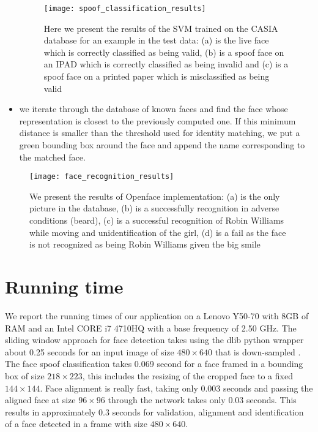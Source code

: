\begin{itemize}
	\begin{figure}[H]
		\captionsetup{width=15cm,font=small}
		\begin{center}
			\texttt{[image: spoof\_classification\_results]}
			\caption[Examples on spoof classification]{Here we present the results of the SVM trained on the CASIA database for an example in the test data: (a) is the live face which is correctly classified as being valid, (b) is a spoof face on an IPAD which is correctly classified as being invalid and (c) is a spoof face on a printed paper which is misclassified as being valid}
		\end{center}
		\label{fig:spoof_classification_results}
	\end{figure}
	\item we iterate through the database of known faces and find the face whose representation is closest to the previously computed one. If this minimum distance is smaller than the threshold used for identity matching, we put a green bounding box around the face and append the name corresponding to the matched face. 
\end{itemize} 
\begin{figure}[H]
	\captionsetup{width=15cm,font=small}
	\begin{center}
		\texttt{[image: face\_recognition\_results]}
		\caption[Examples of face recognition]{We present the results of Openface implementation: (a) is the only picture in the database, (b) is a successfully recognition in adverse conditions (beard), (c) is a successful recognition of Robin Williams while moving and unidentification of the girl, (d) is a fail as the face is not recognized as being Robin Williams given the big smile}
	\end{center}
	\label{fig:face_recognition_examples}
\end{figure}
\section{Running time}
We report the running times of our application on a Lenovo Y50-70 with 8GB of RAM and an Intel CORE i7 4710HQ with a base frequency of 2.50 GHz. The sliding window approach for face detection takes using the dlib python wrapper about 0.25 seconds for an input image of size $480\times640$ that is down-sampled . The face spoof classification takes 0.069 second for a face framed in a bounding box of size $218\times223$, this includes the resizing of the cropped face to a fixed $144\times144$. Face alignment is really fast, taking only 0.003 seconds and passing the aligned face at size $96\times96$ through the network takes only 0.03 seconds. This results in approximately 0.3 seconds for validation, alignment and identification of a face detected in a frame with size $480\times640$.
